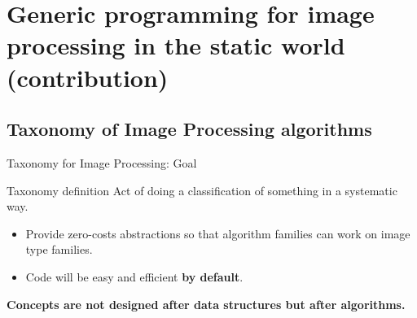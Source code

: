 \documentclass[12pt,aspectratio=169]{beamer}
\begin{document}
%
%
%
\section[Generic programming for image processing in the static world (contribution)]{Generic programming for image processing in the static world (contribution)}

\subsection{Taxonomy of Image Processing algorithms}

\begin{frame}{Taxonomy for Image Processing: Goal}
  \begin{alertblock}{Taxonomy definition}
    \vspace{0.2cm}
    Act of doing a classification of something in a systematic way.
  \end{alertblock}
  \begin{itemize}
    \item Provide zero-costs abstractions so that algorithm families can work on image type families.
    \item Code will be easy and efficient \textbf{by default}.
  \end{itemize}
  \begin{center}
    \textbf{Concepts are not designed after data structures but after algorithms.}
  \end{center}
\end{frame}
\end{document}
